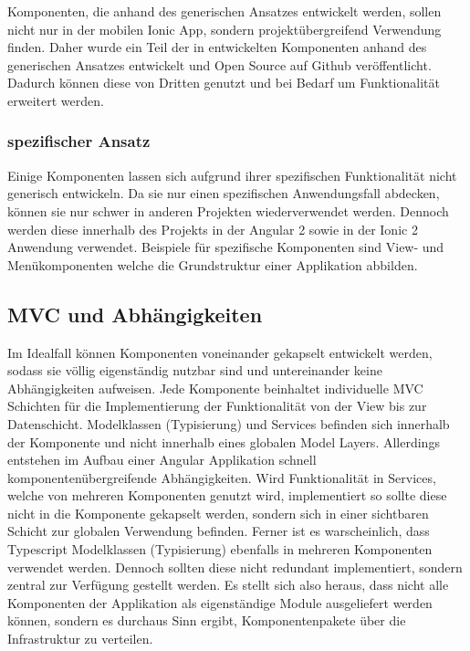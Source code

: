Komponenten,
die anhand des generischen Ansatzes entwickelt werden,
sollen nicht nur in der mobilen Ionic App,
sondern projektübergreifend Verwendung finden.
Daher wurde ein Teil der in \projectname{} entwickelten Komponenten anhand des generischen Ansatzes
entwickelt und Open Source auf Github veröffentlicht.
Dadurch können diese von Dritten genutzt und bei Bedarf um Funktionalität erweitert werden.


\subsubsection{spezifischer Ansatz}

Einige Komponenten lassen sich aufgrund ihrer spezifischen Funktionalität nicht generisch entwickeln.
Da sie nur einen spezifischen Anwendungsfall abdecken, können sie nur schwer in anderen Projekten wiederverwendet werden.
Dennoch werden diese innerhalb des Projekts \projectname{}
in der Angular 2 sowie in der Ionic 2 Anwendung verwendet.
Beispiele für spezifische Komponenten sind View- und Menükomponenten welche die Grundstruktur einer Applikation abbilden.

\subsection{MVC und Abhängigkeiten}

Im Idealfall können Komponenten voneinander gekapselt entwickelt werden,
sodass sie völlig eigenständig nutzbar sind und untereinander keine Abhängigkeiten aufweisen.
Jede Komponente beinhaltet individuelle \ac{MVC} Schichten für die Implementierung der Funktionalität von der View bis zur Datenschicht.
Modelklassen (Typisierung) und Services befinden sich innerhalb der Komponente und nicht innerhalb eines globalen Model Layers.
Allerdings entstehen im Aufbau einer Angular Applikation schnell komponentenübergreifende Abhängigkeiten.
Wird Funktionalität in Services, welche von mehreren Komponenten genutzt wird, implementiert
so sollte diese nicht in die Komponente gekapselt werden, sondern sich in einer sichtbaren Schicht zur globalen Verwendung befinden.
Ferner ist es warscheinlich, dass Typescript Modelklassen (Typisierung) ebenfalls in mehreren Komponenten verwendet werden.
Dennoch sollten diese nicht redundant implementiert,
sondern zentral zur Verfügung gestellt werden. Es stellt sich also heraus,
dass nicht alle Komponenten der Applikation \projectname{} als eigenständige Module ausgeliefert werden können,
sondern es durchaus Sinn ergibt, Komponentenpakete über die Infrastruktur zu verteilen.


